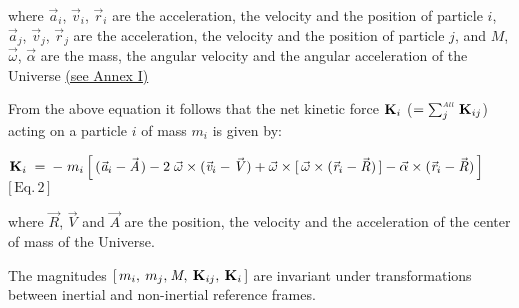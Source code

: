 \documentclass[10pt]{article}
\begin{document}
\par \bigskip \noindent where ${\vec{\mathit{a}}}_{i}$, ${\vec{\mathit{v}}}_{i}$, ${\vec{\mathit{r}}}_{i}$ are the acceleration, the velocity and the position of particle $i$, ${\vec{\mathit{a}}}_{j}$, ${\vec{\mathit{v}}}_{j}$, ${\vec{\mathit{r}}}_{j}$ are the acceleration, the velocity and the position of particle $j$, and ${\mathit{M}}$, ${\vec{\omega}}$, ${\vec{\alpha}}$ are the mass, the angular velocity and the angular acceleration of the Universe \hyperlink{a1p1}{(\hspace{+0.09em}see Annex I\hspace{+0.120em})}

\par \bigskip \noindent From the above equation it follows that the net kinetic force ${\mathbf{K}}_{\hspace{+0.009em}i}$ (\hspace{+0.237em}$ = \sum_{j}^{\scriptscriptstyle{\mathit{All}}} \, {\mathbf{K}}_{\hspace{+0.009em}ij}$\hspace{+0.237em}) acting on a particle $i$ of mass $m_i$ is given by:

\par \bigskip \hypertarget{e1p2}{} ${\mathbf{K}}_{\hspace{+0.009em}i} \;=\: - \; m_i \, \Big[ \, ({\vec{\mathit{a}}}_{i} - {\vec{\mathit{A}}}\hspace{+0.06em}) - 2 \; {\vec{\omega}} \times ({\vec{\mathit{v}}}_{i} - {\vec{\mathit{V}}}) + {\vec{\omega}} \times [ \, {\vec{\omega}} \times ({\vec{\mathit{r}}}_{i} - {\vec{\mathit{R}}}) \, ] - {\vec{\alpha}} \times ({\vec{\mathit{r}}}_{i} - {\vec{\mathit{R}}}) \, \Big]$$\;\;$$\big[\,{\mathrm{Eq.\,2}}\,\big]$

\par \bigskip \noindent where ${\vec{\mathit{R}}}$, ${\vec{\mathit{V}}}$ and ${\vec{\mathit{A}}}$ are the position, the velocity and the acceleration of the center of mass of the Universe.

\par \bigskip \noindent The magnitudes $[ \, m_i, \: m_j,\hspace{+0.06em} {\mathit{M}}\hspace{-0.09em}, \: {\mathbf{K}}_{\hspace{+0.009em}ij}, \: {\mathbf{K}}_{\hspace{+0.009em}i} \, ]$ are invariant under transformations between inertial and non-inertial reference frames.
\end{document}
